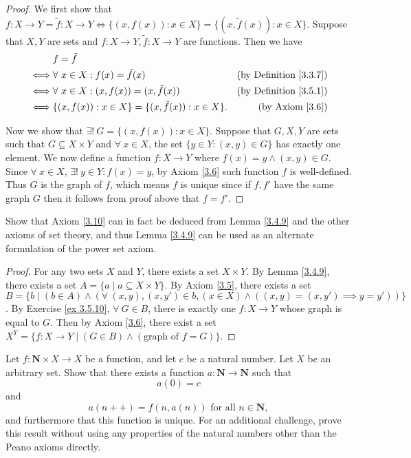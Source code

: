 \begin{proof}
We first show that \(f : X \to Y = \tilde{f} : X \to Y \iff \{(x, f(x)) : x \in X\} = \{(x, \tilde{f}(x)) : x \in X\}\).
Suppose that \(X, Y\) are sets and \(f : X \to Y, \tilde{f} : X \to Y\) are functions.
Then we have
\begin{align*}
& f = \tilde{f} \\
\iff & \forall\ x \in X : f(x) = \tilde{f}(x) & \text{(by Definition \ref{3.3.7})} \\
\iff & \forall\ x \in X : (x, f(x)) = (x, \tilde{f}(x)) & \text{(by Definition \ref{3.5.1})} \\
\iff & \{(x, f(x)) : x \in X\} = \{(x, \tilde{f}(x)) : x \in X\}. & \text{(by Axiom \ref{3.6})}
\end{align*}

Now we show that \(\exists!\ G = \{(x, f(x)) : x \in X\}\).
Suppose that \(G, X, Y\) are sets such that \(G \subseteq X \times Y\) and \(\forall\ x \in X\), the set \(\{y \in Y : (x, y) \in G\}\) has exactly one element.
We now define a function \(f : X \to Y\) where \(f(x) = y \land (x, y) \in G\).
Since \(\forall\ x \in X\), \(\exists!\ y \in Y : f(x) = y\), by Axiom \ref{3.6} such function \(f\) is well-defined.
Thus \(G\) is the graph of \(f\), which means \(f\) is unique since if \(f, f'\) have the same graph \(G\) then it follows from proof above that \(f = f'\).
\end{proof}

\begin{exercise}\label{ex 3.5.11}
Show that Axiom \ref{3.10} can in fact be deduced from Lemma \ref{3.4.9} and the other axioms of set theory, and thus Lemma \ref{3.4.9} can be used as an alternate formulation of the power set axiom.
\end{exercise}

\begin{proof}
For any two sets \(X\) and \(Y\), there exists a set \(X \times Y\).
By Lemma \ref{3.4.9}, there exists a set \(A = \{a \mid a \subseteq X \times Y\}\).
By Axiom \ref{3.5}, there exists a set \(B = \{b \mid (b \in A) \land (\forall\ (x, y), (x, y') \in b, (x \in X) \land ((x, y) = (x, y') \implies y = y'))\}\).
By Exercise \ref{ex 3.5.10}, \(\forall\ G \in B\), there is exactly one \(f : X \to Y\) whose graph is equal to \(G\).
Then by Axiom \ref{3.6}, there exist a set \(X^Y = \{f : X \to Y \mid (G \in B) \land (\text{graph of } f = G)\}\).
\end{proof}

\begin{exercise}\label{ex 3.5.12}
Let \(f : \mathbf{N} \times X \to X\) be a function, and let \(c\) be a natural number.
Let \(X\) be an arbitrary set.
Show that there exists a function \(a : \mathbf{N} \to \mathbf{N}\) such that
\[
    a(0) = c
\]
and
\[
    a(n++) = f(n, a(n)) \text{ for all } n \in \mathbf{N},
\]
and furthermore that this function is unique.
For an additional challenge, prove this result without using any properties of the natural numbers other than the Peano axioms directly.
\end{exercise}

